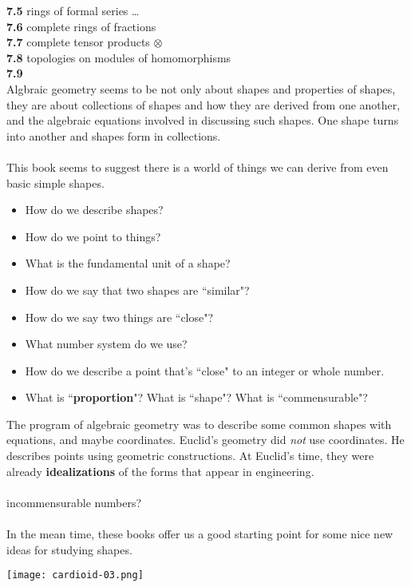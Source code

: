 \documentclass[12pt]{article}
\begin{document}
\indent \textbf{7.5} rings of formal series \dots \\ 
\indent \textbf{7.6} complete rings of fractions \\ 
\indent \textbf{7.7} complete tensor products $\otimes$ \\
\indent \textbf{7.8} topologies on modules of homomorphisms \\ 
\indent \textbf{7.9} 
  \\
Algbraic geometry seems to be not only about shapes and properties of shapes, they are about collections of shapes and how they are derived from one another, and the algebraic equations involved in discussing such shapes.  One shape turns into another and shapes form in collections.  \\ \\
This book seems to suggest there is a world of things we can derive from even basic simple shapes. 
\begin{itemize}
\item How do we describe shapes? 
\item How do we point to things?
\item What is the fundamental unit of a shape?
\item How do we say that two shapes are ``similar"?
\item How do we say two things are ``close"?
\item What number system do we use? 
\item How do we describe a point that's ``close" to an integer or whole number.
\item What is ``\textbf{proportion}"?  What is ``shape"?  What is ``commensurable"? 
\end{itemize}
The program of algebraic geometry was to describe some common shapes with equations, and maybe coordinates.  Euclid's geometry did \textit{not} use coordinates.  He describes points using geometric constructions.  At Euclid's time, they were already \textbf{idealizations} of the forms that appear in engineering. \\ \\
incommensurable numbers? \\ \\
In the mean time, these books offer us a good starting point for some nice new ideas for studying shapes.

\newpage

\texttt{[image: cardioid-03.png]}

\vfill
\end{document}
